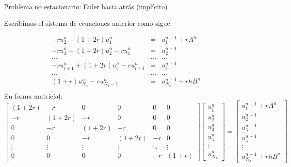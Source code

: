\documentclass{beamer}
\begin{document}
\begin{frame}{Problema no estacionario: Euler hacia atr\'as (impl\'icito)}

\begin{footnotesize}
Escribimos el sistema de ecuaciones anterior como sigue:

\begin{eqnarray*}
-r u_{2}^{n} + (1+2r) u_{1}^{n} & = & u_{1}^{n-1} + r A^{n}\\
-r u_{3}^{n} + (1+2r) u_{2}^{n} - r u_{1}^{n} & = & u_{2}^{n-1} \\
\dots & \dots & \dots \\
-r u_{i+1}^{n} + (1+2r) u_{i}^{n} - r u_{i-1}^{n} & = & u_{i}^{n-1} \\
\dots & \dots & \dots \\
(1+r) u_{N_x}^{n} - r u_{N_x-1}^{n} & = & u_{N_x}^{n-1} + r h B^{n}\\
\end{eqnarray*}
%
En forma matricial:
\[
\left[
\begin{matrix}
(1+2r) & -r     & 0      & 0      & 0      & 0  \\
-r     & (1+2r) & -r     & 0      & 0      & 0  \\
0      & -r     & (1+2r) & -r     & 0      & 0  \\
0      & 0      & -r     & (1+2r) & -r     & 0  \\
\vdots & \vdots & \vdots & \vdots & \ddots & \vdots \\
0      & 0      & 0      & 0      & -r     & (1+r) 
\end{matrix}
\right] \left[
\begin{matrix}
u_{1}^{n} \\ u_{2}^{n} \\u_{3}^{n} \\u_{4}^{n} \\ \vdots \\u_{N_x}^{n}
\end{matrix}
\right] = \left[
\begin{matrix}
u_{1}^{n-1} + rA^{n} \\ u_{2}^{n-1} \\u_{3}^{n-1} \\u_{4}^{n-1} \\ \vdots \\u_{N_x}^{n-1} + rh B^{n}
\end{matrix}
\right]
\]
\end{footnotesize}

\end{frame}
\end{document}
